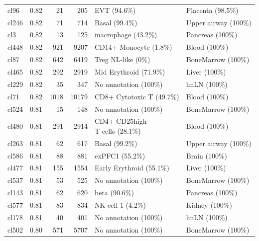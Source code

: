 \begin{table}[ht!]
\begin{tabular}{lrrrll}
  cl96 & 0.82 &  21 & 205 & EVT (94.6\%) & Placenta (98.5\%) \\ 
  cl246 & 0.82 &  71 & 714 & Basal (99.4\%) & Upper airway (100\%) \\ 
  cl3 & 0.82 &  13 & 125 & macrophage (43.2\%) & Pancreas (100\%) \\ 
  cl448 & 0.82 & 921 & 9207 & CD14+ Monocyte (1.8\%) & Blood (100\%) \\ 
  cl87 & 0.82 & 642 & 6419 & Treg NL-like (0\%) & BoneMarrow (100\%) \\ 
  cl465 & 0.82 & 292 & 2919 & Mid Erythroid (71.9\%) & Liver (100\%) \\ 
  cl229 & 0.82 &  35 & 347 & No annotation (100\%) & hnLN (100\%) \\ 
  cl71 & 0.82 & 1018 & 10179 & CD8+ Cytotoxic T (49.7\%) & Blood (100\%) \\ 
  cl524 & 0.81 &  15 & 148 & No annotation (100\%) & BoneMarrow (100\%) \\ 
  cl480 & 0.81 & 291 & 2914 & \specialcell[t]{CD4+ CD25high\\T cells (28.1\%)} & Blood (100\%) \\ 
  cl263 & 0.81 &  62 & 617 & Basal (99.2\%) & Upper airway (100\%) \\ 
  cl586 & 0.81 &  88 & 881 & exPFC1 (55.2\%) & Brain (100\%) \\ 
  cl477 & 0.81 & 155 & 1554 & Early Erythroid (55.1\%) & Liver (100\%) \\ 
  cl537 & 0.81 &  53 & 525 & No annotation (100\%) & BoneMarrow (100\%) \\ 
  cl143 & 0.81 &  62 & 620 & beta (90.6\%) & Pancreas (100\%) \\ 
  cl577 & 0.81 &  83 & 834 & NK cell 1 (4.2\%) & Kidney (100\%) \\ 
  cl178 & 0.81 &  40 & 401 & No annotation (100\%) & hnLN (100\%) \\ 
  cl502 & 0.80 & 571 & 5707 & No annotation (100\%) & BoneMarrow (100\%) \\ 
   \bottomrule
\end{tabular}
\end{table}  
  
